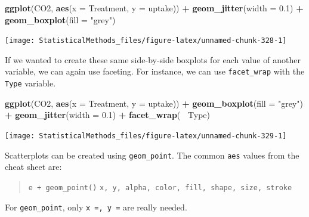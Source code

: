 \documentclass[
]{book}
\newenvironment{Shaded}{\begin{snugshade}}{\end{snugshade}}
\newcommand{\DataTypeTok}[1]{\textcolor[rgb]{0.13,0.29,0.53}{#1}}
\newcommand{\FloatTok}[1]{\textcolor[rgb]{0.00,0.00,0.81}{#1}}
\newcommand{\KeywordTok}[1]{\textcolor[rgb]{0.13,0.29,0.53}{\textbf{#1}}}
\newcommand{\NormalTok}[1]{#1}
\newcommand{\OperatorTok}[1]{\textcolor[rgb]{0.81,0.36,0.00}{\textbf{#1}}}
\newcommand{\StringTok}[1]{\textcolor[rgb]{0.31,0.60,0.02}{#1}}
\theoremstyle{definition}
\theoremstyle{definition}
\theoremstyle{definition}
\theoremstyle{remark}
\begin{document}
\begin{Shaded}
\begin{Highlighting}[]
\KeywordTok{ggplot}\NormalTok{(CO2, }\KeywordTok{aes}\NormalTok{(}\DataTypeTok{x =}\NormalTok{ Treatment, }\DataTypeTok{y =}\NormalTok{ uptake)) }\OperatorTok{+}\StringTok{ }
\StringTok{  }\KeywordTok{geom_jitter}\NormalTok{(}\DataTypeTok{width =} \FloatTok{0.1}\NormalTok{) }\OperatorTok{+}\StringTok{ }
\StringTok{  }\KeywordTok{geom_boxplot}\NormalTok{(}\DataTypeTok{fill =} \StringTok{"grey"}\NormalTok{)}
\end{Highlighting}
\end{Shaded}

\begin{center}\texttt{[image: StatisticalMethods\_files/figure-latex/unnamed-chunk-328-1]} \end{center}

If we wanted to create these same side-by-side boxplots for each value of another variable, we can again use faceting. For instance, we can use \texttt{facet\_wrap} with the \texttt{Type} variable.

\begin{Shaded}
\begin{Highlighting}[]
\KeywordTok{ggplot}\NormalTok{(CO2, }\KeywordTok{aes}\NormalTok{(}\DataTypeTok{x =}\NormalTok{ Treatment, }\DataTypeTok{y =}\NormalTok{ uptake)) }\OperatorTok{+}\StringTok{ }\KeywordTok{geom_boxplot}\NormalTok{(}\DataTypeTok{fill =} \StringTok{"grey"}\NormalTok{) }\OperatorTok{+}
\StringTok{  }\KeywordTok{geom_jitter}\NormalTok{(}\DataTypeTok{width =} \FloatTok{0.1}\NormalTok{) }\OperatorTok{+}\StringTok{ }\KeywordTok{facet_wrap}\NormalTok{(}\OperatorTok{~}\StringTok{ }\NormalTok{Type)}
\end{Highlighting}
\end{Shaded}

\begin{center}\texttt{[image: StatisticalMethods\_files/figure-latex/unnamed-chunk-329-1]} \end{center}

Scatterplots can be created using \texttt{geom\_point}. The common \texttt{aes} values from the cheat sheet are:

\begin{quote}
\texttt{e\ +\ geom\_point()}
\texttt{x,\ y,\ alpha,\ color,\ fill,\ shape,\ size,\ stroke}
\end{quote}

For \texttt{geom\_point}, only \texttt{x\ =,\ y\ =} are really needed.
\end{document}

